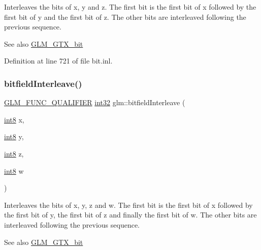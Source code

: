 Interleaves the bits of x, y and z. The first bit is the first bit of x followed by the first bit of y and the first bit of z. The other bits are interleaved following the previous sequence.

\begin{DoxySeeAlso}{See also}
\hyperlink{group__gtx__bit}{G\+L\+M\+\_\+\+G\+T\+X\+\_\+bit} 
\end{DoxySeeAlso}


Definition at line 721 of file bit.\+inl.

\mbox{\label{group__gtx__bit_ga7da84ecc2b3a46c9c08a9f40012359cf}} 
\subsubsection{\texorpdfstring{bitfield\+Interleave()}{bitfieldInterleave()}\hspace{0.1cm}{\footnotesize\ttfamily [13/16]}}
{\footnotesize\ttfamily \hyperlink{setup_8hpp_a33fdea6f91c5f834105f7415e2a64407}{G\+L\+M\+\_\+\+F\+U\+N\+C\+\_\+\+Q\+U\+A\+L\+I\+F\+I\+ER} \hyperlink{group__gtc__type__precision_ga632d8b25f6b61659f39ea4321fab92a4}{int32} glm\+::bitfield\+Interleave (\begin{DoxyParamCaption}\item[{\hyperlink{group__gtc__type__precision_ga96254f9c1c4506fc8eb5cf3301ce8565}{int8}}]{x,  }\item[{\hyperlink{group__gtc__type__precision_ga96254f9c1c4506fc8eb5cf3301ce8565}{int8}}]{y,  }\item[{\hyperlink{group__gtc__type__precision_ga96254f9c1c4506fc8eb5cf3301ce8565}{int8}}]{z,  }\item[{\hyperlink{group__gtc__type__precision_ga96254f9c1c4506fc8eb5cf3301ce8565}{int8}}]{w }\end{DoxyParamCaption})}

Interleaves the bits of x, y, z and w. The first bit is the first bit of x followed by the first bit of y, the first bit of z and finally the first bit of w. The other bits are interleaved following the previous sequence.

\begin{DoxySeeAlso}{See also}
\hyperlink{group__gtx__bit}{G\+L\+M\+\_\+\+G\+T\+X\+\_\+bit} 
\end{DoxySeeAlso}


